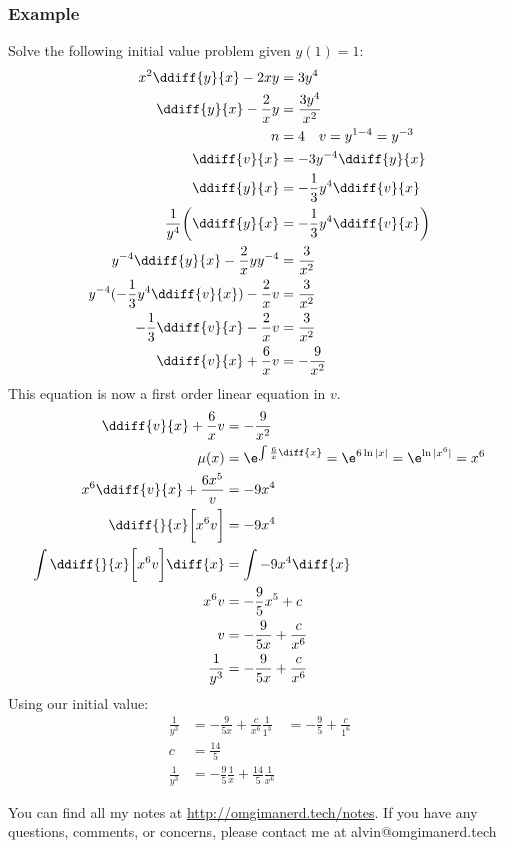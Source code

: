 \documentclass{math}
\begin{document}
\subsubsection*{Example}
Solve the following initial value problem given \( y(1) = 1 \):
\begin{align*}
  x^2\ddiff{y}{x}-2xy &= 3y^4 \\
  \ddiff{y}{x}-\frac{2}{x}y &= \frac{3y^4}{x^2} \\
  n &= 4 \quad v = y^{1-4} = y^{-3} \\
  \ddiff{v}{x} &= -3y^{-4}\ddiff{y}{x} \\
  \ddiff{y}{x} &= -\frac{1}{3}y^4\ddiff{v}{x} \\
  \frac{1}{y^4}\bigg(\ddiff{y}{x} &= -\frac{1}{3}y^4\ddiff{v}{x}\bigg) \\
  y^{-4}\ddiff{y}{x}-\frac{2}{x}yy^{-4} &= \frac{3}{x^2} \\
  y^{-4}(-\frac{1}{3}y^4\ddiff{v}{x})-\frac{2}{x}v &= \frac{3}{x^2} \\
  -\frac{1}{3}\ddiff{v}{x}-\frac{2}{x}v &= \frac{3}{x^2} \\
  \ddiff{v}{x}+\frac{6}{x}v &= -\frac{9}{x^2}
\end{align*}
This equation is now a first order linear equation in \( v \).
\begin{align*}
  \ddiff{v}{x}+\frac{6}{x}v &= -\frac{9}{x^2} \\
  \mu(x) &= \e^{\int\frac{6}{x}\diff{x}} = \e^{6\ln|x|} = \e^{\ln|x^6|} = x^6 \\
  x^6\ddiff{v}{x}+\frac{6x^5}v &= -9x^4 \\
  \ddiff{}{x}\bigg[x^6v\bigg] &= -9x^4 \\
  \int\ddiff{}{x}\bigg[x^6v\bigg]\diff{x} &= \int-9x^4\diff{x} \\
  x^6v &= -\frac{9}{5}x^5+c \\
  v &= -\frac{9}{5x}+\frac{c}{x^6} \\
  \frac{1}{y^3} &= -\frac{9}{5x}+\frac{c}{x^6}
\end{align*}
Using our initial value:
\begin{align*}
  \frac{1}{y^3} &= -\frac{9}{5x}+\frac{c}{x^6}
  \frac{1}{1^3} &= -\frac{9}{5}+\frac{c}{1^6} \\
  c &= \frac{14}{5} \\
  \frac{1}{y^3} &= -\frac{9}{5}\frac{1}{x}+\frac{14}{5}\frac{1}{x^6}
\end{align*}

\begin{center}
  You can find all my notes at \url{http://omgimanerd.tech/notes}. If you have
  any questions, comments, or concerns, please contact me at
  alvin@omgimanerd.tech
\end{center}
\end{document}
